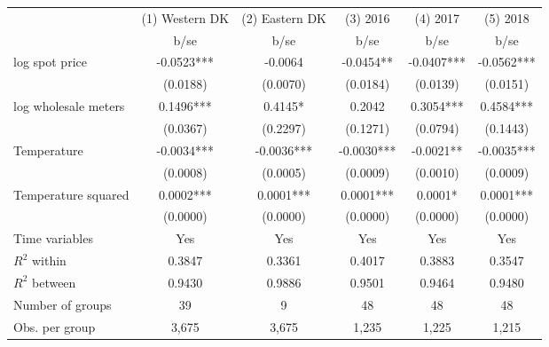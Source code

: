 \begin{tabular}{lccccc}\toprule
                    &(1) Western DK   &(2) Eastern DK   &    (3) 2016   &    (4) 2017   &    (5) 2018   \\
                    &        b/se   &        b/se   &        b/se   &        b/se   &        b/se   \\
\midrule
log spot price      &     -0.0523***&     -0.0064   &     -0.0454** &     -0.0407***&     -0.0562***\\
                    &    (0.0188)   &    (0.0070)   &    (0.0184)   &    (0.0139)   &    (0.0151)   \\
log wholesale meters&      0.1496***&      0.4145*  &      0.2042   &      0.3054***&      0.4584***\\
                    &    (0.0367)   &    (0.2297)   &    (0.1271)   &    (0.0794)   &    (0.1443)   \\
Temperature         &     -0.0034***&     -0.0036***&     -0.0030***&     -0.0021** &     -0.0035***\\
                    &    (0.0008)   &    (0.0005)   &    (0.0009)   &    (0.0010)   &    (0.0009)   \\
Temperature squared &      0.0002***&      0.0001***&      0.0001***&      0.0001*  &      0.0001***\\
                    &    (0.0000)   &    (0.0000)   &    (0.0000)   &    (0.0000)   &    (0.0000)   \\
Time variables      &         Yes   &         Yes   &         Yes   &         Yes   &         Yes   \\
\midrule
\(R^2\) within      &      0.3847   &      0.3361   &      0.4017   &      0.3883   &      0.3547   \\
\(R^2\) between     &      0.9430   &      0.9886   &      0.9501   &      0.9464   &      0.9480   \\
Number of groups    &          39   &           9   &          48   &          48   &          48   \\
Obs. per group      &       3,675   &       3,675   &       1,235   &       1,225   &       1,215   \\
\bottomrule\end{tabular}
